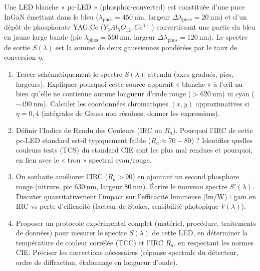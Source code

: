 \documentclass[11pt]{article}
\begin{document}
\begin{exercice}
Une LED blanche « pc-LED » (phosphor-converted) est constituée d'une puce InGaN émettant dans le bleu ($\lambda_{\text{puce}} = \SI{450}{\nano\metre}$, largeur $\Delta\lambda_{\text{puce}} = \SI{20}{\nano\metre}$) et d'un dépôt de phosphorate YAG:Ce ($Y_3Al_5O_{12}:Ce^{3+}$) convertissant une partie du bleu en jaune large bande (pic $\lambda_{\text{phos}} = \SI{560}{\nano\metre}$, largeur $\Delta\lambda_{\text{phos}} = \SI{120}{\nano\metre}$). Le spectre de sortie $S(\lambda)$ est la somme de deux gaussiennes pondérées par le taux de conversion $\eta$.
\begin{enumerate}
    \item Tracer schématiquement le spectre $S(\lambda)$ attendu (axes gradués, pics, largeurs). Expliquer pourquoi cette source apparaît « blanche » à l'œil nu bien qu'elle ne contienne aucune longueur d'onde rouge ($> \SI{620}{\nano\metre}$) ni cyan ($\sim \SI{490}{\nano\metre}$). Calculer les coordonnées chromatiques $(x, y)$ approximatives si $\eta = 0,4$ (intégrales de Gauss non résolues, donner les expressions).
    \item Définir l'Indice de Rendu des Couleurs (IRC ou $R_a$). Pourquoi l'IRC de cette pc-LED standard est-il typiquement faible ($R_a \approx 70-80$) ? Identifier quelles couleurs tests (TCS) du standard CIE sont les plus mal rendues et pourquoi, en lien avec le « trou » spectral cyan/rouge.
    \item On souhaite améliorer l'IRC ($R_a > 90$) en ajoutant un second phosphore rouge (nitrure, pic $\SI{630}{\nano\metre}$, largeur $\SI{80}{\nano\metre}$). Écrire le nouveau spectre $S'(\lambda)$. Discuter quantitativement l'impact sur l'efficacité lumineuse (lm/W) : gain en IRC vs perte d'efficacité (facteur de Stokes, sensibilité photopique $V(\lambda)$).
    \item Proposer un protocole expérimental complet (matériel, procédure, traitements de données) pour mesurer le spectre $S(\lambda)$ de cette LED, en déterminer la température de couleur corrélée (TCC) et l'IRC $R_a$, en respectant les normes CIE. Préciser les corrections nécessaires (réponse spectrale du détecteur, ordre de diffraction, étalonnage en longueur d'onde).
\end{enumerate}
\end{exercice}
\end{document}
